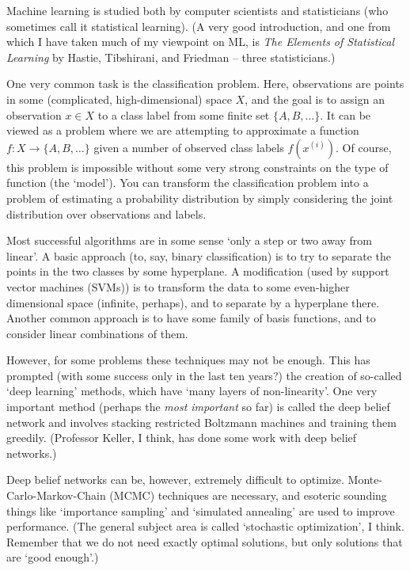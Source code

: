 \documentclass[11pt]{article}
\begin{document}
Machine learning is studied both by computer scientists and statisticians (who
sometimes call it statistical learning).  (A very good introduction, and one
from which I have taken much of my viewpoint on ML, is \textit{The Elements of
Statistical Learning} by Hastie, Tibshirani, and Friedman -- three
statisticians.)

One very common task is the classification problem.  Here, observations are
points in some (complicated, high-dimensional) space $X$, and the goal is to
assign an observation $x \in X$ to a class label from some finite set $\{A, B,
\ldots \}$.  It can be viewed as a problem where we are attempting to
approximate a function $f : X \to \{A, B, \ldots\}$ given a number of observed
class labels $f(x^{(i)})$.  Of course, this problem is impossible without some very
strong constraints on the type of function (the `model').  You can transform the
classification problem into a problem of estimating a probability distribution
by simply considering the joint distribution over observations and labels.

Most successful algorithms are in some sense `only a step or two away from
linear'.  A basic approach (to, say, binary classification) is to try to
separate the points in the two classes by some hyperplane.  A modification (used
by support vector machines (SVMs)) is to transform the data to some even-higher
dimensional space (infinite, perhaps), and to separate by a hyperplane there.
Another common approach is to have some family of basis functions, and to
consider linear combinations of them.

However, for some problems these techniques may not be enough.  This has
prompted (with some success only in the last ten years?) the creation of
so-called `deep learning' methods, which have `many layers of non-linearity'.
One very important method (perhaps the \emph{most important} so far) is called
the deep belief network and involves stacking restricted Boltzmann machines and
training them greedily.  (Professor Keller, I think, has done some work with
deep belief networks.)  

Deep belief networks can be, however, extremely difficult to optimize.
Monte-Carlo-Markov-Chain (MCMC) techniques are necessary, and esoteric sounding
things like `importance sampling' and `simulated annealing' are used to improve
performance.  (The general subject area is called `stochastic optimization', I
think.  Remember that we do not need exactly optimal solutions, but only
solutions that are `good enough'.)
\end{document}
